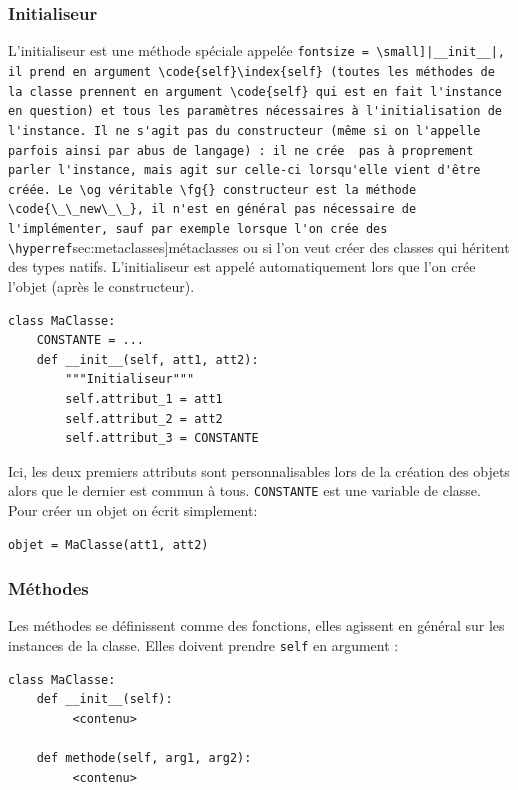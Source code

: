 \documentclass[a4paper, french, 10pt]{article}
\newcommand{\code}[1]{{\small\texttt{#1}}}
\begin{document}
\subsubsection{Initialiseur}

L'initialiseur est une méthode spéciale appelée \Verb[fontsize = \small]|__init__|, il prend en argument \code{self}\index{self} (toutes les méthodes de la classe prennent en argument \code{self} qui est en fait l'instance en question) et tous les paramètres nécessaires à l'initialisation de l'instance. Il ne s'agit pas du constructeur (même si on l'appelle parfois ainsi par abus de langage) : il ne crée  pas à proprement parler l'instance, mais agit sur celle-ci lorsqu'elle vient d'être créée. Le \og véritable \fg{} constructeur est la méthode \code{\_\_new\_\_}, il n'est en général pas nécessaire de l'implémenter, sauf par exemple lorsque l'on crée des \hyperref[sec:metaclasses]{métaclasses} ou si l'on veut créer des classes qui héritent des types natifs. L'initialiseur est appelé automatiquement lors que l'on crée l'objet (après le constructeur).
\begin{verbatim}
class MaClasse:
    CONSTANTE = ...
    def __init__(self, att1, att2):
        """Initialiseur"""
        self.attribut_1 = att1
        self.attribut_2 = att2
        self.attribut_3 = CONSTANTE
\end{verbatim}
Ici, les deux premiers attributs sont personnalisables lors de la création des objets alors que le dernier est commun à tous. \code{CONSTANTE} est une variable de classe. Pour créer un objet on écrit simplement:
\begin{verbatim}
objet = MaClasse(att1, att2)
\end{verbatim}

\subsubsection{Méthodes}
Les méthodes se définissent comme des fonctions, elles agissent en général sur les instances de la classe. Elles doivent prendre \code{self} en argument :
\begin{verbatim}
class MaClasse:
    def __init__(self):
         <contenu>

    def methode(self, arg1, arg2):
         <contenu>
\end{verbatim}
\end{document}
